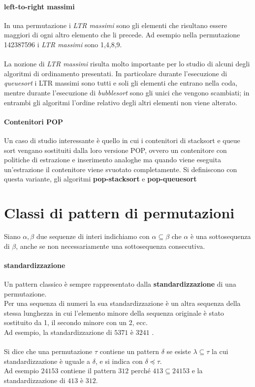 \paragraph*{left-to-right massimi} In una permutazione i \textit{LTR massimi} sono gli elementi che risultano essere maggiori di ogni altro elemento che li precede. Ad esempio nella permutazione 142387596 i \textit{LTR massimi} sono 1,4,8,9.\\\\
La nozione di \textit{LTR massimi} risulta molto importante per lo studio di alcuni degli algoritmi di ordinamento presentati. In particolare durante l'esecuzione di \textit{queuesort} i LTR massimi sono tutti e soli gli elementi che entrano nella coda, mentre durante l'esecuzione di \textit{bubblesort} sono gli unici che vengono scambiati; in entrambi gli algoritmi l'ordine relativo degli altri elementi non viene alterato.
\paragraph*{Contenitori POP}Un caso di studio interessante \`e quello in cui i contenitori di stacksort e queue sort vengano sostituiti dalla loro versione POP, ovvero un contenitore con politiche di estrazione e inserimento analoghe ma quando viene eseguita un'estrazione il contenitore viene svuotato completamente. Si definiscono con questa variante, gli algoritmi \textbf{pop-stacksort} e \textbf{pop-queuesort} 
\section*{Classi di pattern di permutazioni}
Siano $\alpha,\beta$ due sequenze di interi indichiamo con $\alpha \subseteq \beta$ che $\alpha$ \`e una sottosequenza di $\beta$, anche se non necessariamente una sottosequenza consecutiva\cite{bouvel2022preimages}.
\paragraph*{standardizzazione}
Un pattern classico \`e sempre rappresentato dalla \textbf{standardizzazione} di una permutazione.\\Per una sequenza di numeri la sua standardizzazione\cite{claesson2012sorting} \`e un altra sequenza della stessa lunghezza in cui l'elemento minore della sequenza originale \`e stato sostituito da 1, il secondo minore con un 2, ecc.\\
Ad esempio, la standardizzazione di $5371$ \`e $3241$ .\\\\
Si dice che una permutazione $\tau$ contiene un pattern $\delta$ se esiste $\lambda\subseteq\tau$ la cui standardizzazione \`e uguale a $\delta$, e si indica con $\delta\preceq\tau$. \\Ad esempio $24153$ contiene il pattern $312$ perch\'e $413\subseteq{24153}$ e la standardizzazione di $413$ \`e $312$.
